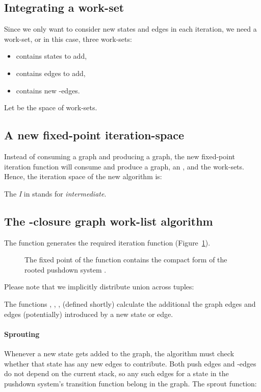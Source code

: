 \subsection{Integrating a work-set}
Since we only want to consider new states and edges in each iteration,
we need a work-set, or in this case, three work-sets:
\begin{itemize}
\item{ contains states to add,}
\item{ contains edges to add,}
\item{ contains new -edges.}
\end{itemize}
Let  be the space of work-sets.

\subsection{A new fixed-point iteration-space}
Instead of consuming a graph and producing a graph, the new fixed-point iteration function will consume and produce a graph,
an \ecg{}, and the work-sets.
Hence, the iteration space of the new algorithm is:

The \emph{I} in  stands for \emph{intermediate}.



\subsection{The -closure 
  graph work-list algorithm}
The function  generates the required iteration function (Figure~\ref{fig:mkcompact-ecg}).
\begin{figure}
\figrule

\caption{The fixed point of the function  contains
  the compact form of the rooted pushdown system .}
\label{fig:mkcompact-ecg}
\figrule
\end{figure}
Please note that we implicitly distribute union across tuples:

The functions , , ,  (defined shortly)
calculate the additional the graph edges and \ecg{} edges
(potentially) introduced by a new state or edge.

\paragraph{Sprouting}
Whenever a new state gets added to the graph, 
the algorithm must check whether that state has any new edges to contribute.
Both push edges and -edges do not depend on the current
stack, so any such edges for a state in the pushdown system's
transition function belong in the graph. 
The sprout function:

